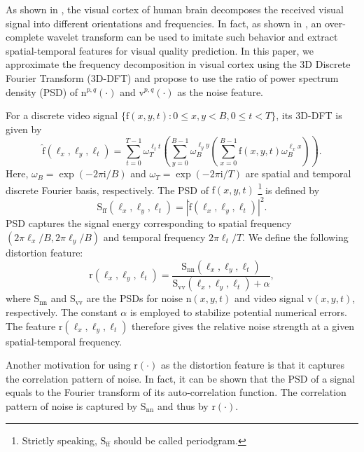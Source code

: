 \documentclass{sig-alternate}
\begin{document}
As shown in \cite{Bov2013,Dau1985,OlsFie2005}, the visual cortex of human brain decomposes the received visual signal into different orientations and frequencies. In fact, as shown in \cite{Gir1989,MOVIE}, an over-complete wavelet transform can be used to imitate such behavior and extract spatial-temporal features for visual quality prediction. In this paper, we approximate the frequency decomposition in visual cortex using the 3D Discrete Fourier Transform (3D-DFT) and propose to use the ratio of power spectrum density (PSD) of $\mathrm{n}^{p,q}(\cdot)$ and $\mathrm{v}^{p,q}(\cdot)$ as the noise feature. 

For a discrete video signal $\{\mathrm{f}(x,y,t):0\leq x,y<B, 0\leq t<T\}$, its 3D-DFT is given by
\begin{equation*}
\label{eq:dft}
\mathrm{\hat f}(\ell_x,\ell_y,\ell_t)=\sum_{t=0}^{T-1}\omega_T^{\ell_t t}\left(\sum_{y=0}^{B-1}\omega_B^{\ell_y y}\left(\sum_{x=0}^{B-1}\mathrm{f}(x,y,t)\omega_B^{\ell_x x}\right)\right).
\end{equation*}
Here, $\omega_B=\exp(-2\pi\mathrm{i}/B)$ and $\omega_T=\exp(-2\pi\mathrm{i}/T)$ are spatial and temporal discrete Fourier basis, respectively. The PSD of $\mathrm{f}(x,y,t)$ \footnote{Strictly speaking, $\mathrm{S_{ff}}$ should be called periodgram.} is defined by
\begin{equation}
\label{eq:psd}
\mathrm{S_{ff}}(\ell_x,\ell_y,\ell_t) = |\mathrm{\hat f}(\ell_x,\ell_y,\ell_t)|^2.
\end{equation}
PSD captures the signal energy corresponding to spatial frequency $(2\pi\ell_x/B,2\pi\ell_y/B)$ and temporal frequency $2\pi\ell_t/T$. We define the following distortion feature:
\begin{equation}
\label{eq:feature}
\mathrm{r}(\ell_x,\ell_y,\ell_t)=\frac{\mathrm{S_{nn}}(\ell_x,\ell_y,\ell_t)}{\mathrm{S_{vv}}(\ell_x,\ell_y,\ell_t) + \alpha},
\end{equation}
where $\mathrm{S_{nn}}$ and $\mathrm{S_{vv}}$ are the PSDs for noise $\mathrm{n}(x,y,t)$ and video signal $\mathrm{v}(x,y,t)$, respectively. The constant $\alpha$ is employed to stabilize potential numerical errors. The feature $\mathrm{r}(\ell_x,\ell_y,\ell_t)$ therefore gives the relative noise strength at a given spatial-temporal frequency.  

Another motivation for using $\mathrm{r}(\cdot)$ as the distortion feature is that it captures the correlation pattern of noise. In fact, it can be shown that the PSD of a signal equals to the Fourier transform of its auto-correlation function. The correlation pattern of noise is captured by $\mathrm{S_{nn}}$ and thus by $\mathrm{r}(\cdot)$. 
\end{document}

